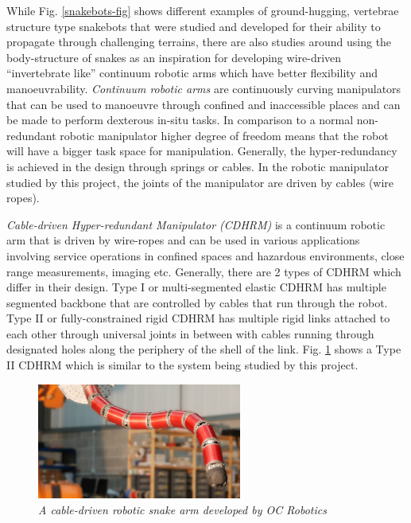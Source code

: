 \documentclass[a4paper,12pt]{report}
\begin{document}
While Fig. \ref{snakebots-fig} shows different examples of ground-hugging, vertebrae structure type snakebots that were studied and developed for their ability to propagate through challenging terrains, there are also studies around using the body-structure of snakes as an inspiration for developing wire-driven “invertebrate like” continuum robotic arms which have better flexibility and manoeuvrability. \textit{Continuum robotic arms} are continuously curving manipulators that can be used to manoeuvre through confined and inaccessible places and can be made to perform dexterous in-situ tasks. In comparison to a normal non-redundant robotic manipulator higher degree of freedom means that the robot will have a bigger task space for manipulation. Generally, the hyper-redundancy is achieved in the design through springs or cables. In the robotic manipulator studied by this project, the joints of the manipulator are driven by cables (wire ropes).

\textit{Cable-driven Hyper-redundant Manipulator (CDHRM)} is a continuum robotic arm that is driven by wire-ropes and can be used in various applications involving service operations in confined spaces and hazardous environments, close range measurements, imaging etc. Generally, there are 2 types of CDHRM which differ in their design. Type I or multi-segmented elastic CDHRM has multiple segmented backbone that are controlled by cables that run through the robot. Type II or fully-constrained rigid CDHRM has multiple rigid links attached to each other through universal joints in between with cables running through designated holes along the periphery of the shell of the link. Fig. \ref{Type2-CDHRM} shows a Type II CDHRM which is similar to the system being studied by this project. 

\begin{figure}
	\centering
	\includegraphics[width=0.6\textwidth]{images/CDHM.jpg}
	\caption{\textit{A cable-driven robotic snake arm developed by OC Robotics \cite{CNNarticle}}}
	\label{Type2-CDHRM}
\end{figure}
\end{document}
